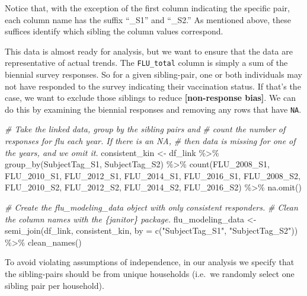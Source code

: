 \documentclass[10pt,a4paper,onecolumn]{article}
\newenvironment{Shaded}{\begin{snugshade}}{\end{snugshade}}
\newcommand{\AttributeTok}[1]{\textcolor[rgb]{0.77,0.63,0.00}{#1}}
\newcommand{\CommentTok}[1]{\textcolor[rgb]{0.56,0.35,0.01}{\textit{#1}}}
\newcommand{\FunctionTok}[1]{\textcolor[rgb]{0.00,0.00,0.00}{#1}}
\newcommand{\NormalTok}[1]{#1}
\newcommand{\OtherTok}[1]{\textcolor[rgb]{0.56,0.35,0.01}{#1}}
\newcommand{\SpecialCharTok}[1]{\textcolor[rgb]{0.00,0.00,0.00}{#1}}
\newcommand{\StringTok}[1]{\textcolor[rgb]{0.31,0.60,0.02}{#1}}
\begin{document}
Notice that, with the exception of the first column indicating the
specific pair, each column name has the suffix ``\_S1'' and ``\_S2.'' As
mentioned above, these suffices identify which sibling the column values
correspond.

This data is almost ready for analysis, but we want to ensure that the
data are representative of actual trends. The \texttt{FLU\_total} column
is simply a sum of the biennial survey responses. So for a given
sibling-pair, one or both individuals may not have responded to the
survey indicating their vaccination status. If that's the case, we want
to exclude those siblings to reduce \textbf{{[}non-response bias{]}}. We
can do this by examining the biennial responses and removing any rows
that have \texttt{NA}.

\begin{Shaded}
\begin{Highlighting}[]
\CommentTok{\# Take the linked data, group by the sibling pairs and}
\CommentTok{\# count the number of responses for flu each year. If there is an NA, }
\CommentTok{\# then data is missing for one of the years, and we omit it.}
\NormalTok{consistent\_kin }\OtherTok{\textless{}{-}}\NormalTok{ df\_link }\SpecialCharTok{\%\textgreater{}\%} 
  \FunctionTok{group\_by}\NormalTok{(SubjectTag\_S1, SubjectTag\_S2) }\SpecialCharTok{\%\textgreater{}\%} 
  \FunctionTok{count}\NormalTok{(FLU\_2008\_S1, FLU\_2010\_S1, }
\NormalTok{        FLU\_2012\_S1, FLU\_2014\_S1, }
\NormalTok{        FLU\_2016\_S1, FLU\_2008\_S2, }
\NormalTok{        FLU\_2010\_S2, FLU\_2012\_S2, }
\NormalTok{        FLU\_2014\_S2, FLU\_2016\_S2) }\SpecialCharTok{\%\textgreater{}\%} 
  \FunctionTok{na.omit}\NormalTok{()}

\CommentTok{\# Create the flu\_modeling\_data object with only consistent responders.}
\CommentTok{\# Clean the column names with the \{janitor\} package.}
\NormalTok{flu\_modeling\_data }\OtherTok{\textless{}{-}} \FunctionTok{semi\_join}\NormalTok{(df\_link, }
\NormalTok{                               consistent\_kin, }
                               \AttributeTok{by =} \FunctionTok{c}\NormalTok{(}\StringTok{"SubjectTag\_S1"}\NormalTok{, }
                                      \StringTok{"SubjectTag\_S2"}\NormalTok{)) }\SpecialCharTok{\%\textgreater{}\%}
  \FunctionTok{clean\_names}\NormalTok{()}
\end{Highlighting}
\end{Shaded}

To avoid violating assumptions of independence, in our analysis we
specify that the sibling-pairs should be from unique households (i.e.~we
randomly select one sibling pair per household).
\end{document}
